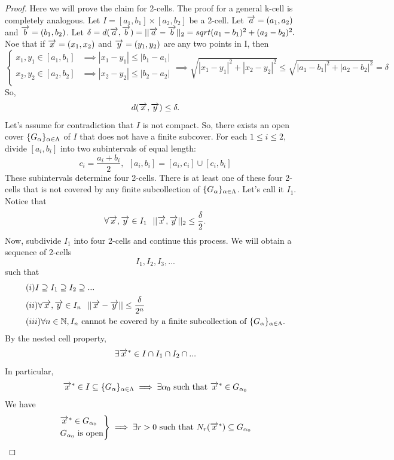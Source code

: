 \documentclass[a4paper]{article}
\begin{document}
	\begin{proof}
		Here we will prove the claim for 2-cells. The proof for a general k-cell is completely analogous.
		Let $I = [a_1,b_1] \times [a_2,b_2]$ be a 2-cell. Let $\overrightarrow{a}=(a_1,a_2)$ and $\overrightarrow{b}=(b_1,b_2)$.
		Let $\delta = d(\overrightarrow{a}, \overrightarrow{b})= ||\overrightarrow{a} - \overrightarrow{b}||_2 = sqrt{(a_1-b_1)^2+(a_2-b_2)^2}.$
		Noe that if $\overrightarrow{x}=(x_1,x_2)$ and $\overrightarrow{y}=(y_1,y_2)$ are any two points in I, then
		$$\begin{cases}
			x_1,y_1 \in [a_1,b_1] &\implies |x_1 - y_1| \leq |b_1 - a_1| \\
			x_2,y_2 \in [a_2,b_2] &\implies |x_2 - y_2| \leq |b_2 - a_2| \\
		\end{cases}
		\implies \sqrt{|x_1-y_1|^2+|x_2-y_2|^2} \leq \sqrt{|a_1-b_1|^2+|a_2-b_2|^2} = \delta$$
		So, $$d(\overrightarrow{x}, \overrightarrow{y}) \leq \delta.$$
		Let's assume for contradiction that $I$ is not compact. So, there exists an open cover $\{G_\alpha \}_{\alpha \in \Lambda}$ of $I$ that does not have a finite subcover.
		For each $1 \leq i \leq 2$, divide $[a_i, b_i]$ into two subintervals of equal length:
		$$c_i= \frac{a_i + b_i}{2}, ~~ [a_i,b_i]=[a_i, c_i] \cup [c_i, b_i]$$
		These subintervals determine four 2-cells. There is at least one of these four 2-cells that is not covered by any finite subcollection of $\{G_\alpha \}_{\alpha \in \Lambda}$.
		Let's call it $I_1$. Notice that
		$$\forall \overrightarrow{x}, \overrightarrow{y} \in I_1 ~~ ||\overrightarrow{x}, \overrightarrow{y}||_2 \leq \frac{\delta}{2}.$$
		Now, subdivide $I_1$ into four 2-cells and continue this process. We will obtain a sequence of 2-cells
		$$I_1, I_2, I_3, ... $$
		such that
		\begin{align*}
			&(i) I \supseteq I_1 \supseteq I_2 \supseteq ... \\
			&(ii) \forall \overrightarrow{x}, \overrightarrow{y} \in I_n ~~ ||\overrightarrow{x}-\overrightarrow{y}|| \leq \frac{\delta}{2^n} \\
			&(iii) \forall n \in \mathbb{N}, I_n \text{ cannot be covered by a finite subcollection of } \{G_\alpha \}_{\alpha \in \Lambda}.
		\end{align*}
		By the nested cell property,
		$$\exists \overrightarrow{x}^* \in I\cap I_1 \cap I_2 \cap...$$
		In particular,
		$$\overrightarrow{x}^* \in I \subseteq \{G_\alpha \}_{\alpha \in \Lambda} \implies \exists \alpha_0 \text{ such that } \overrightarrow{x}^* \in G_{\alpha_0}$$
		We have
		$$\begin{rcases}
			\overrightarrow{x}^* \in G_{\alpha_0} \\
			G_{\alpha_0} \text{ is open}
		\end{rcases}
		\implies \exists r > 0 \text{ such that } N_r(\overrightarrow{x}^*) \subseteq G_{\alpha_0}$$

\end{proof}
\end{document}
